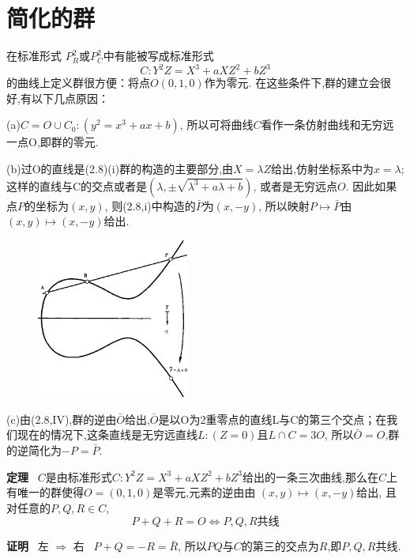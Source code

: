 \documentclass[UTF8]{book}
\begin{document}
	\section{简化的群}
		在标准形式
		$P^{2}_{R}$或$P^{2}_{C}$中有能被写成标准形式
		\begin{equation*}
		C:Y^{2}Z=X^{3}+aXZ^{2}+bZ^{3}
		\end{equation*}
		的曲线上定义群很方便：将点$ O(0,1,0) $作为零元. 在这些条件下,群的建立会很好,有以下几点原因：
		
		(a)$C={O}\cup C_{0}:(y^{2}=x^{3}+ax+b)$, 所以可将曲线$ C $看作一条仿射曲线和无穷远一点O,即群的零元.
		
		(b)过O的直线是(2.8)(i)群的构造的主要部分,由$X=\lambda Z$给出,仿射坐标系中为$x=\lambda$; 这样的直线与C的交点或者是$(\lambda,\pm \sqrt{\lambda^{3}+a\lambda+b})$, 或者是无穷远点$ O $. 因此如果点$ P $的坐标为$ (x,y) $, 则(2.8,i)中构造的$\bar{P}$为$ (x,-y) $, 所以映射$P\mapsto\bar{P}$由 $(x,y)\mapsto(x,-y)$给出.
		
		\begin{figure}[h]
		  \centering
		  \includegraphics[width=5cm]{39.jpg}\\
		\end{figure}
	
	
	
		(c)由(2.8,IV),群的逆由$\bar{O}$给出,$\bar{O}$是以O为2重零点的直线L与C的第三个交点；在我们现在的情况下,这条直线是无穷远直线$ L:(Z=0) $且$L\cap C=3O$, 所以$\bar{O}=O$,群的逆简化为$-P=\bar{P}$.
		
		
		\textbf{定理} \ 
		$ C $是由标准形式$C:Y^{2}Z=X^{3}+aXZ^{2}+bZ^{3}$给出的一条三次曲线,那么在$ C $上有唯一的群使得$ O=(0,1,0) $是零元,元素的逆由由 $(x,y)\mapsto(x,-y)$给出, 且对任意的$P,Q,R\in C$,
		\begin{equation*}
			P+Q+R=O \Longleftrightarrow P,Q,R\text{共线}
		\end{equation*}
		
		
		\justifying	
		\textbf{证明} \ 左 $\Rightarrow$ 右 \   $P+Q=-R=\bar{R}$, 所以$ PQ $与$ C $的第三的交点为$ R $,即$ P,Q,R $共线.
		
\end{document}
